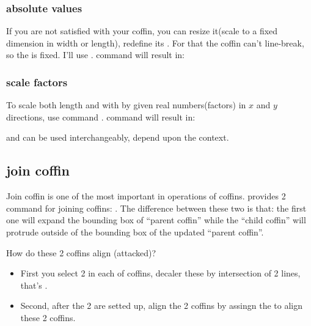 \documentclass[
    lang=en, 
    class=article,
    classOption={11pt},
    toc={redef}
]{zlatex}
\begin{document}
\subsubsection{absolute values}
If you are not satisfied with your coffin, you can resize it(scale to a fixed dimension in width or length), redefine 
its . For that the coffin \cmd{\mycoffin} can't line-break, so the  is fixed. 
I'll use \cmd{\myvcoffin}. command \cmd{\ResizeCoffin\myvcoffin{4em}{2em+6em}} will result in:


\pp\NewCoffin\tempcoffin
\SetVerticalCoffin{}
\usecoffin{\tempcoffin}\hspace*{6em}
\ResizeCoffin\tempcoffin{4em}{2em+6em}
\usecoffin{\tempcoffin}

\subsubsection{scale factors}
To scale both length and with by given real numbers(factors) in $x$ and $y$ directions, use 
command . command 
will result in:


\pp\NewCoffin\tempIIcoffin
\SetVerticalCoffin{}
\usecoffin{\myvcoffin}\hspace*{6em}
\ScaleCoffin{}
\usecoffin{\tempIIcoffin}

\cmd{\ResizeCoffin} and \cmd{\ScaleCoffin} can be used interchangeably, depend upon the context.



\subsection{join coffin}
Join coffin is one of the most important in operations of coffins.  provides 2 command for 
joining coffins: \cmd{\JoinCoffins, \JoinCoffins*}. The difference between these two is that: the first one 
will expand the bounding box of ``parent coffin'' while the ``child coffin'' will protrude outside of the 
bounding box of the updated ``parent coffin''.

How do these 2 coffins align (attacked)? 
\begin{itemize}
    \item First you select 2  in each of coffins, decaler these 
        by intersection of 2 lines, that's . 
    \item Second, after the 2  are setted up, align the 2 coffins by assingn the 
         to align these 2 coffins.
\end{itemize}
\end{document}
